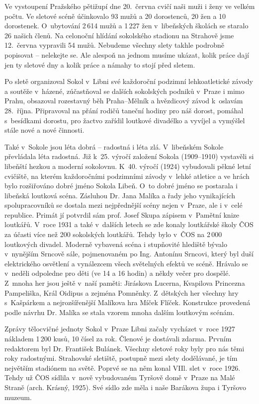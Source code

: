 \documentclass[a5paper, 11pt, twoside]{article}
\begin{document}
Ve vystoupení Pražského pětižupí dne 20.~června cvičí naši muži i ženy
ve velkém počtu. Ve sletové scéně účinkovalo 93 mužů a 20 dorostenců, 20
žen a 10 dorostenek. O~ubytování 2\,614 mužů a 1\,227 žen v~libeňských
školách se staralo 26 našich členů. Na celonoční hlídání sokolského
stadionu na Strahově jsme 12.~června vypravili 54 mužů. Nebudeme všechny
slety takhle podrobně popisovat -- nelekejte se. Ale alespoň na jednom
musíme ukázat, kolik práce dají jen ty sletové dny a kolik práce a
námahy to stojí před sletem.

Po sletě organizoval Sokol v~Libni své každoroční podzimní
lehkoatletické závody a soutěže v~házené, zúčastňoval se dalších
sokolských podniků v~Praze i mimo Prahu, obsazoval rozestavný běh
Praha--Mělník a hvězdicový závod k~oslavám 28.~října. Připravoval na přání
rodičů taneční hodiny pro náš dorost, pomáhal s~besídkami dorostu, pro
žactvo zařídil loutkové divadélko a vyvíjel a vymýšlel stále nové a nové
činnosti.

Také v~Sokole jsou léta dobrá --⁠⁠⁠⁠⁠⁠ radostná i léta zlá. V~libeňském Sokole
převládala léta radostná. Již k~25. výročí založení Sokola
(1909--1910) vystavěli si libeňští hezkou a moderní
sokolovnu. K~40. výročí (1924) vybudovali pěkné letní cvičiště, na
kterém každoročními podzimními závody v~lehké atletice a ve hrách bylo
rozšiřováno dobré jméno Sokola Libeň. O~to dobré jméno se postarala i
libeňská loutková scéna. Zásluhou Dr. Jana Malíka a řady jeho %
vynikajících spolupracovníků se dostala mezi nejpřednější scény nejen
v~Praze, ale i v~celé republice. Primát jí potvrdil sám prof. Josef Skupa
zápisem v~Pamětní knize loutkářů. V~roce 1931 a také v~dalších letech se
zde konaly loutkářské školy ČOS za účasti více než 200 sokolských
loutkářů. Tehdy bylo v~ČOS na 2\,000 loutkových divadel. Moderně vybavená
scéna i stupňovité hlediště bývalo v~nynějším Srncově sále, pojmenovaném
po Ing. Antonínu Srncovi, který byl duší elektrického osvětlení a
vynálezcem všech světelných efektů ve scéně. Hrávalo se v~neděli
odpoledne pro děti (ve 14 a 16 hodin) a někdy večer pro dospělé. Z~mnoha
her jsou ještě v~naší paměti: Jiráskova Lucerna, Kvapilova Princezna
Pampeliška, Král Oidipus a zejména Pomněnky. Z~dětských her všechny hry
s~Kašpárkem a nejrozšířenější Malíkova hra Míček Flíček. Konstrukce
provedená podle návrhu Dr. Malíka se stala vzorem mnoha dalším loutkovým
scénám.

Zprávy tělocvičné jednoty Sokol v~Praze Libni začaly vycházet v~roce
1927 nákladem 1\,200 kusů, 10 čísel za rok. Členové je dostávali zdarma.
Prvním redaktorem byl Dr. František Bulánek. Všechny sletové roky byly
pro nás těmi roky radostnými. Strahovské sletiště, postupně mezi slety
dodělávané, je tím největším stadiónem na světě. Poprvé se na něm konal
VIIl. slet v~roce 1926. Tehdy už ČOS sídlila v~nově vybudovaném Tyršově
domě v~Praze na Malé Straně (arch. Krásný, 1925). Své sídlo zde měla i
naše Barákova župa i Tyršovo muzeum.
\end{document}
